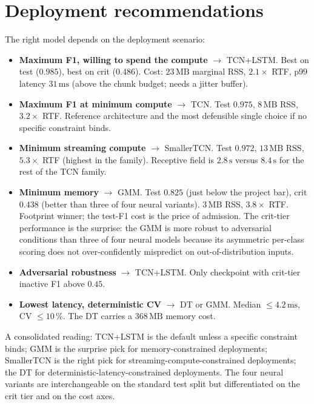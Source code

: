 \section{Deployment recommendations}
\label{sec:conclusion_recommendations}

The right model depends on the deployment scenario:

\begin{itemize}
    \item \textbf{Maximum F1, willing to spend the compute} $\to$ TCN+LSTM. Best on test ($0.985$), best on crit ($0.486$). Cost: $23\,\text{MB}$ marginal RSS, $2.1\times$ RTF, p99 latency $31\,\text{ms}$ (above the chunk budget; needs a jitter buffer).
    \item \textbf{Maximum F1 at minimum compute} $\to$ TCN. Test $0.975$, $8\,\text{MB}$ RSS, $3.2\times$ RTF. Reference architecture and the most defensible single choice if no specific constraint binds.
    \item \textbf{Minimum streaming compute} $\to$ SmallerTCN. Test $0.972$, $13\,\text{MB}$ RSS, $5.3\times$ RTF (highest in the family). Receptive field is $2.8\,\text{s}$ versus $8.4\,\text{s}$ for the rest of the TCN family.
    \item \textbf{Minimum memory} $\to$ GMM. Test $0.825$ (just below the project bar), crit $0.438$ (better than three of four neural variants). $3\,\text{MB}$ RSS, $3.8\times$ RTF. Footprint winner; the test-F1 cost is the price of admission. The crit-tier performance is the surprise: the GMM is more robust to adversarial conditions than three of four neural models because its asymmetric per-class scoring does not over-confidently mispredict on out-of-distribution inputs.
    \item \textbf{Adversarial robustness} $\to$ TCN+LSTM. Only checkpoint with crit-tier inactive F1 above $0.45$.
    \item \textbf{Lowest latency, deterministic CV} $\to$ DT or GMM. Median $\le 4.2\,\text{ms}$, CV $\le 10\,\%$. The DT carries a $368\,\text{MB}$ memory cost.
\end{itemize}

A consolidated reading: TCN+LSTM is the default unless a specific constraint binds; GMM is the surprise pick for memory-constrained deployments; SmallerTCN is the right pick for streaming-compute-constrained deployments; the DT for deterministic-latency-constrained deployments.
The four neural variants are interchangeable on the standard test split but differentiated on the crit tier and on the cost axes.

